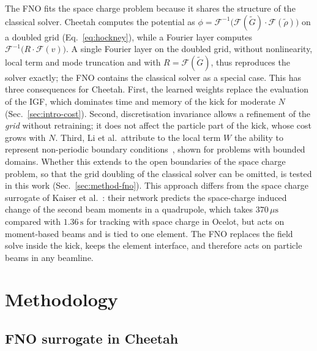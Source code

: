 The FNO fits the space charge problem because it shares the structure of
the classical solver. Cheetah computes the potential as
$\phi = \mathcal{F}^{-1}\big(\mathcal{F}(\tilde G)\cdot
\mathcal{F}(\tilde\rho)\big)$ on a doubled grid (Eq.~\eqref{eq:hockney}),
while a Fourier layer computes $\mathcal{F}^{-1}\big(R\cdot
\mathcal{F}(v)\big)$. A single Fourier layer on the doubled grid, without
nonlinearity, local term and mode truncation and with
$R=\mathcal{F}(\tilde G)$, thus reproduces the solver exactly; the FNO
contains the classical solver as a special case. This has three
consequences for Cheetah. First, the learned weights replace the
evaluation of the IGF, which dominates time and memory of the kick for
moderate $N$ (Sec.~\ref{sec:intro-cost}). Second, discretisation
invariance allows a refinement of the \emph{grid} without retraining; it
does not affect the particle part of the kick, whose cost grows with $N$.
Third, Li et al.\ attribute to the local term $W$ the ability to represent
non-periodic boundary conditions~\cite{li2021fno}, shown for problems with
bounded domains. Whether this extends to the open boundaries of the space
charge problem, so that the grid doubling of the classical solver can be
omitted, is tested in this work (Sec.~\ref{sec:method-fno}).
This approach differs from the space charge surrogate of Kaiser et
al.~\cite{kaiser2024cheetah}: their network predicts the space-charge
induced change of the second beam moments in a quadrupole, which takes
$370\,\mu\mathrm{s}$ compared with $1.36\,\mathrm{s}$ for tracking with
space charge in Ocelot, but acts on moment-based beams and is tied
to one element. The FNO replaces the field solve inside the kick, keeps
the element interface, and therefore acts on particle beams in any
beamline.


\section{Methodology}
\label{sec:method}

\subsection{FNO surrogate in Cheetah}

